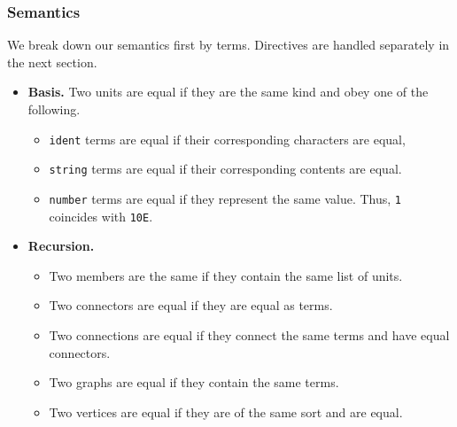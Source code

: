   \label{table:grammars}




\subsubsection*{Semantics}
We break down our semantics first by terms. Directives are handled separately in the next section.
\begin{definition}

\begin{itemize}
  \item \textbf{Basis.} Two units are equal if they are the same kind and obey one of the following.
	\begin{itemize}
	  \item \texttt{ident} terms are equal if their corresponding characters are equal,
    \item \texttt{string} terms are equal if their corresponding contents are equal.
	  \item \texttt{number} terms are equal if they represent the same value. Thus, \texttt{1} coincides with \texttt{10E}.
	\end{itemize}
  \item \textbf{Recursion.}
        \begin{itemize}
        \item Two members are the same if they contain the same list of units. %
        \item Two connectors are equal if they are equal as terms. %
 		  \item Two connections are equal if they connect the same terms and have equal connectors.
        \item Two graphs are equal if they contain the same terms.
        \item Two vertices are equal if they are of the same sort and are equal.
	\end{itemize}
\end{itemize}
\end{definition}
